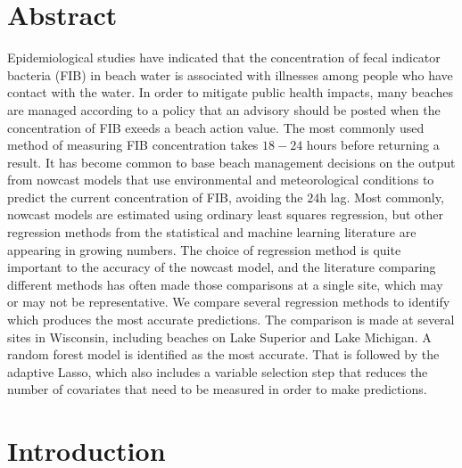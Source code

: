 \section{Abstract}\label{abstract}

Epidemiological studies have indicated that the concentration of fecal
indicator bacteria (FIB) in beach water is associated with illnesses
among people who have contact with the water. In order to mitigate
public health impacts, many beaches are managed according to a policy
that an advisory should be posted when the concentration of FIB exeeds a
beach action value. The most commonly used method of measuring FIB
concentration takes \(18-24\) hours before returning a result. It has
become common to base beach management decisions on the output from
nowcast models that use environmental and meteorological conditions to
predict the current concentration of FIB, avoiding the \(24\)h lag. Most
commonly, nowcast models are estimated using ordinary least squares
regression, but other regression methods from the statistical and
machine learning literature are appearing in growing numbers. The choice
of regression method is quite important to the accuracy of the nowcast
model, and the literature comparing different methods has often made
those comparisons at a single site, which may or may not be
representative. We compare several regression methods to identify which
produces the most accurate predictions. The comparison is made at
several sites in Wisconsin, including beaches on Lake Superior and Lake
Michigan. A random forest model is identified as the most accurate. That
is followed by the adaptive Lasso, which also includes a variable
selection step that reduces the number of covariates that need to be
measured in order to make predictions.

\section{Introduction}\label{introduction}


